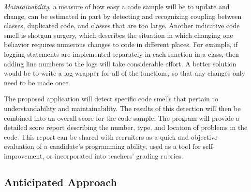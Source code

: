 \documentclass{sig-alternate}
\begin{document}
\emph{Maintainability}, a measure of how easy a code sample will be to update and change, can be estimated in part by detecting and recognizing coupling between classes, duplicated code, and classes that are too large. Another indicative code smell is shotgun surgery, which describes the situation in which changing one behavior requires numerous changes to code in different places. For example, if logging statements are implemented separately in each function in a class, then adding line numbers to the logs will take considerable effort. A better solution would be to write a log wrapper for all of the functions, so that any changes only need to be made once. 

The proposed application will detect specific code smells that pertain to understandability and maintainability. The results of this detection will then be combined into an overall score for the code sample. The program will provide a detailed score report describing the number, type, and location of problems in the code. This report can be shared with recruiters as a quick and objective evaluation of a candidate's programming ability, used as a tool for self-improvement, or incorporated into teachers' grading rubrics. 

\subsection{Anticipated Approach}
\label{subsec:approach}
\end{document}
